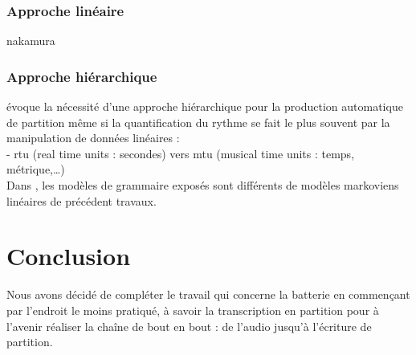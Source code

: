 \subsubsection{Approche linéaire}
nakamura \cite{SHIBATA2021262}
\subsubsection{Approche hiérarchique}
\cite{foscarin:hal-01988990} évoque la nécessité d’une approche hiérarchique pour la production automatique de partition même si la quantification du rythme se fait le plus souvent par la manipulation de données linéaires :\\
- rtu (real time units : secondes) vers mtu (musical time units : temps, métrique,…)\\
Dans \cite{foscarin:hal-01988990}, les modèles de grammaire exposés sont différents de modèles markoviens linéaires de précédent travaux.
\cite{harasimjazz}
\cite{rohrmeier2020towards}
\section{Conclusion}
Nous avons décidé de compléter le travail qui concerne la batterie en commençant par l’endroit le moins pratiqué, à savoir la transcription en partition pour à l’avenir réaliser la chaîne de bout en bout : de l’audio jusqu’à l’écriture de partition.